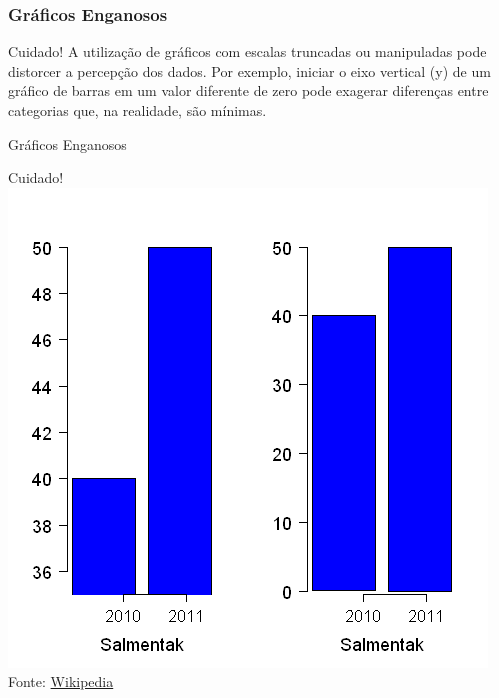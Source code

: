 \documentclass[14pt,aspectratio=1610]{beamer}
\begin{document}
\begin{frame}{}
	\frametitle{Gráficos Enganosos}
	\begin{block}{Cuidado!}
		\justifying
		A utilização de gráficos com escalas truncadas ou manipuladas pode distorcer a percepção dos dados. Por exemplo, iniciar o eixo vertical (y) de um gráfico de barras em um valor diferente de zero pode exagerar diferenças entre categorias que, na rea\-li\-da\-de, são mínimas. 
	\end{block}
\end{frame}


\begin{frame}{Gráficos Enganosos}
	\begin{block}{Cuidado!}
		\centering
		\includegraphics[width=0.5\linewidth]{figs/Enganoso1.png}
		\tiny Fonte: \href{https://pt.wikipedia.org/wiki/Gráfico\_enganoso}{Wikipedia}
	\end{block}
\end{frame}
\end{document}
